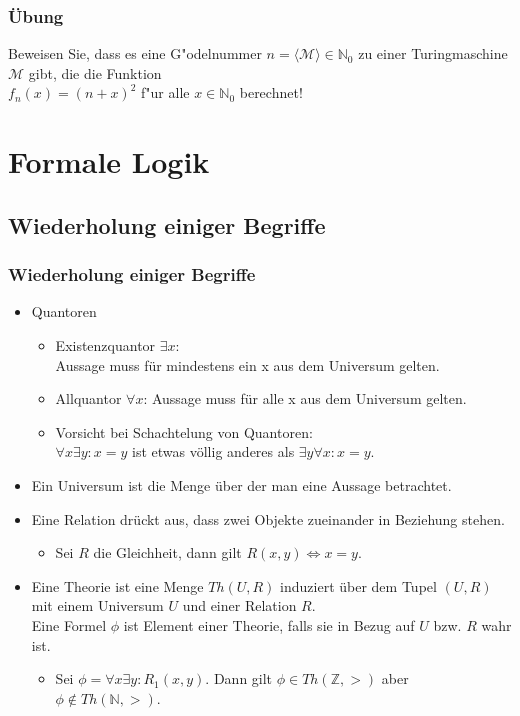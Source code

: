 \begin{frame}
\frametitle{\glqq Übung\grqq}
Beweisen Sie, dass es eine G"odelnummer $n = \langle\mathcal{M}\rangle \in
\mathbb{N}_0$ zu einer Turingmaschine $\mathcal{M}$ gibt, die die Funktion\\
$f_n(x) = (n+x)^2$ f"ur alle $x \in \mathbb{N}_0$ berechnet!
\end{frame}

\section{Formale Logik}
\subsection{Wiederholung einiger Begriffe}
\begin{frame}
	\frametitle{Wiederholung einiger Begriffe}
	\begin{itemize}
		\item Quantoren
		\begin{itemize}
			\item Existenzquantor $\exists x$: \\ Aussage muss für mindestens ein x aus dem Universum gelten.
			\item Allquantor $\forall x$: Aussage muss für alle x aus dem Universum gelten.
			\item Vorsicht bei Schachtelung von Quantoren: \\ $\forall x \exists y: x = y$ ist etwas völlig anderes als $\exists y \forall x: x = y$.
		\end{itemize}
		\item Ein Universum ist die Menge über der man eine Aussage betrachtet.
		\item Eine Relation drückt aus, dass zwei Objekte zueinander in Beziehung stehen.
		\begin{itemize}
			\item Sei $R$ die Gleichheit, dann gilt $R(x, y) \Leftrightarrow x = y$.
		\end{itemize}
		\item Eine Theorie ist eine Menge $Th(U, R)$ induziert über dem Tupel $(U, R)$ mit einem Universum $U$ und einer Relation $R$. \\ 
		Eine Formel $\phi$ ist Element einer Theorie, falls sie in Bezug auf $U$ bzw. $R$ wahr ist.
		\begin{itemize}
			\item Sei $\phi = \forall x \exists y: R_1(x,y)$. Dann gilt $\phi \in Th(\mathbb{Z}, >)$ aber $\phi \notin Th(\mathbb{N}, >)$.
		\end{itemize}
	\end{itemize}
\end{frame}

